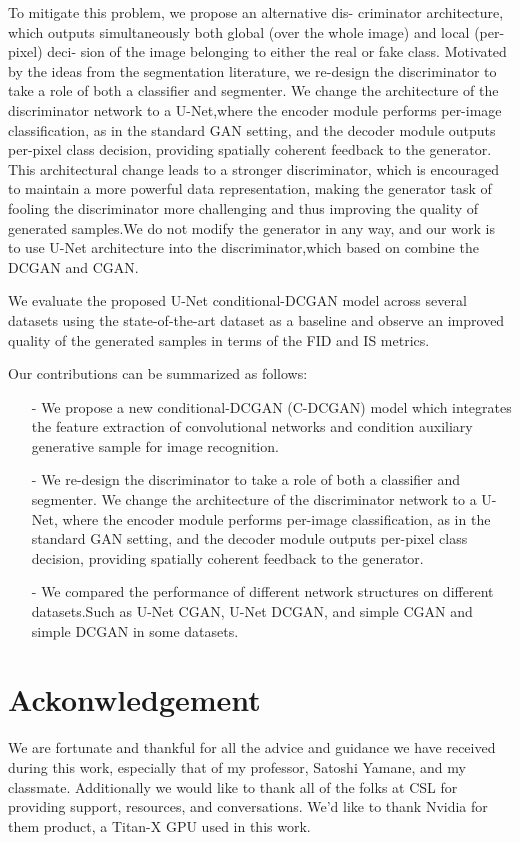 \documentclass[conference, a4paper]{IEEEtran}
\begin{document}
To mitigate this problem, we propose an alternative dis-
criminator architecture, which outputs simultaneously both
global (over the whole image) and local (per-pixel) deci-
sion of the image belonging to either the real or fake class. Motivated by the ideas from the segmentation
literature, we re-design the discriminator to take a role of both a classifier and segmenter. We change the architecture of the discriminator network to a U-Net,where the encoder module performs per-image classification, as in the standard GAN setting, and the decoder module outputs per-pixel class decision, providing spatially coherent feedback to the generator. This architectural change leads to a stronger discriminator, which is encouraged to maintain a more powerful data representation, making the generator task of fooling the discriminator more challenging and thus improving the quality of generated samples.We do not modify the
generator in any way, and our work is to use U-Net architecture into the discriminator,which based on combine the DCGAN and CGAN.

We evaluate the proposed U-Net conditional-DCGAN model across several datasets using the state-of-the-art dataset as a baseline and observe an improved quality of the generated samples in terms of the FID and IS metrics.

Our contributions can be summarized as follows:
\begin{itemize}
	\item[-] We propose a new conditional-DCGAN (C-DCGAN) model which integrates the feature extraction of convolutional networks and condition auxiliary generative sample for image recognition.
	\item[-] We re-design the discriminator to take a role of both a classifier and segmenter. We change the architecture of the discriminator network to a U-Net, where the encoder module performs per-image classification, as in the standard GAN setting, and the decoder module outputs per-pixel class decision, providing spatially coherent feedback to the generator.
	\item[-] We compared the performance of different network structures on different datasets.Such as U-Net CGAN, U-Net DCGAN, and simple CGAN and simple DCGAN in some datasets.
\end{itemize}




\clearpage
\section*{Ackonwledgement}
We are fortunate and thankful for all the advice and guidance we have received during this work, especially that of my professor, Satoshi Yamane, and my classmate. Additionally we would like to thank all of the folks at CSL for providing support, resources, and conversations. We’d like to thank Nvidia for them product, a Titan-X GPU used in this work.
\end{document}
